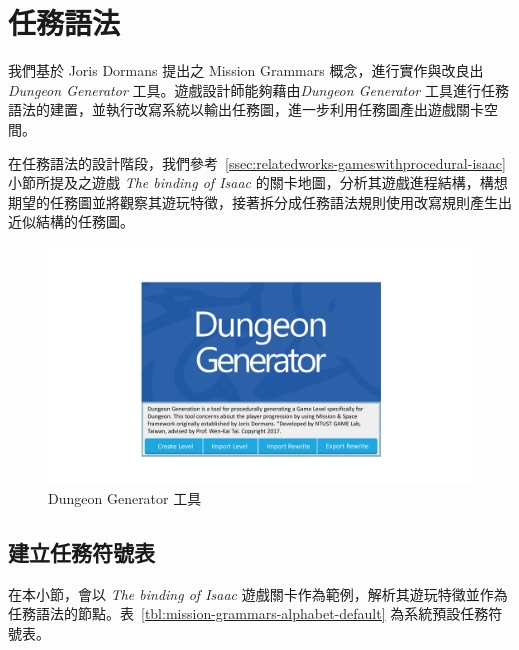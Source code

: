 \section{任務語法}
\label{sec:method-missiongrammars}

我們基於 Joris Dormans 提出之 Mission Grammars 概念，進行實作與改良出\textit{Dungeon Generator} 工具。遊戲設計師能夠藉由\textit{Dungeon Generator} 工具進行任務語法的建置，並執行改寫系統以輸出任務圖，進一步利用任務圖產出遊戲關卡空間。

在任務語法的設計階段，我們參考~\ref{ssec:relatedworks-gameswithprocedural-isaac} 小節所提及之遊戲 \textit{The binding of Isaac} 的關卡地圖，分析其遊戲進程結構，構想期望的任務圖並將觀察其遊玩特徵，接著拆分成任務語法規則使用改寫規則產生出近似結構的任務圖。

\begin{figure}[!htb]
  \begin{center}
    \includegraphics[width=1.0\textwidth]{figures/dungeon_generator.pdf}
    \caption{Dungeon Generator 工具} 
    \label{fig:dungeon-generator}
  \end{center}
\end{figure}

\subsection{建立任務符號表}
\label{ssec:method-missiongrammars-alphabet}

在本小節，會以 \textit{The binding of Isaac} 遊戲關卡作為範例，解析其遊玩特徵並作為任務語法的節點。表~\ref{tbl:mission-grammars-alphabet-default} 為系統預設任務符號表。


